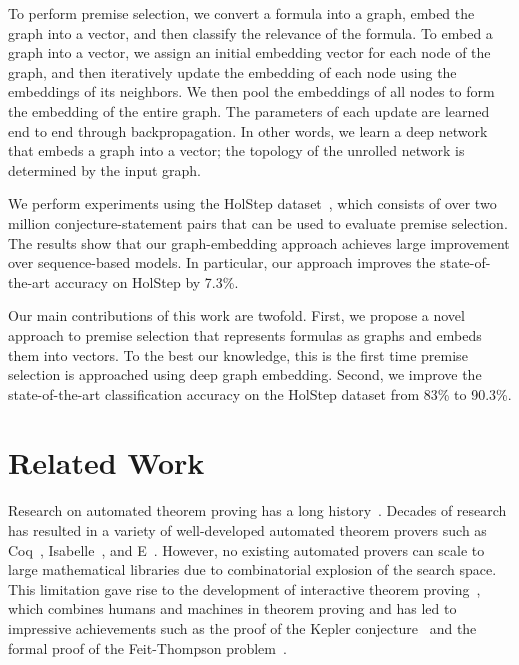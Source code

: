 \documentclass{article}
\begin{document}
To perform premise selection, we convert a formula into a graph, embed the graph into a
vector, and then classify the relevance of the formula. To embed a graph into a vector, we
assign an initial embedding vector for each node of the graph, and then iteratively update
the embedding of each node using the embeddings of its neighbors. We then pool the
embeddings of all nodes to form the embedding of the entire graph. The parameters of each
update are learned end to end through backpropagation. In other words, we learn a deep
network that embeds a graph into a vector; the topology of the unrolled network is
determined by the input graph. 

We perform experiments using the HolStep dataset~\cite{holstep}, which consists of over two
million conjecture-statement pairs that can be used to evaluate premise selection. The
results show that our graph-embedding approach achieves large improvement over sequence-based
models. In particular, our approach improves the state-of-the-art accuracy on HolStep by 7.3\%.

Our main contributions of this work are twofold. First, we propose a novel approach to premise selection
that represents formulas as graphs and embeds them into vectors. To the best our
knowledge, this is the first time premise selection is approached using deep graph
embedding. Second, we improve the state-of-the-art classification accuracy on the HolStep dataset from 83\% to 90.3\%.

\section{Related Work}

Research on automated theorem proving has a long history~\cite{harrison2014history}. 
Decades of research has resulted in a variety of well-developed automated theorem provers
such as Coq~\cite{coq}, Isabelle~\cite{wenzel2008isabelle}, and
E~\cite{schulz2002brainiac}. However, no existing automated provers can scale to 
large mathematical libraries due to combinatorial explosion of the search
space. This limitation gave rise to the development of interactive theorem
proving~\cite{harrison2014history}, which combines humans and machines in theorem proving and has led to impressive 
achievements such as the proof of the Kepler conjecture~\cite{hales2015formal} and the formal
proof of the Feit-Thompson problem~\cite{Gonthier2013}. 
\end{document}
